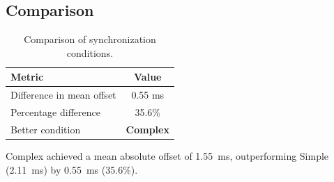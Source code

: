 \subsection*{Comparison}

\begin{table}[h!]
\centering
\begin{tabular}{|l|c|}
\hline
Metric & Value \\
\hline
Difference in mean offset & 0.55 ms \\
Percentage difference & 35.6\% \\
Better condition & \textbf{Complex} \\
\hline
\end{tabular}
\caption{Comparison of synchronization conditions.}
\label{tab:sync_comparison}
\end{table}

Complex achieved a mean absolute offset of 1.55~ms, outperforming Simple (2.11~ms) by 0.55~ms (35.6\%).
